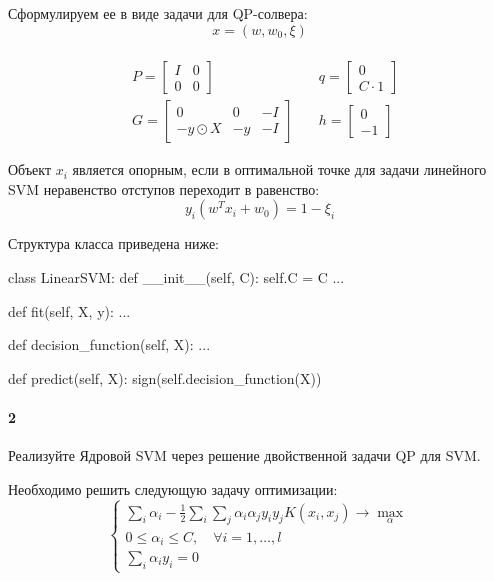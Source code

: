 \documentclass[a4paper,12pt]{article}
\begin{document}
Сформулируем ее в виде задачи для QP-солвера:
$$x = (w, w_0, \xi)$$\\
$$
\begin{aligned}
  &P = \left[ 
         \begin{array}{c|c}
           I & 0 \\
           \hline
           0 & 0
         \end{array}
       \right]
  \quad
  &q = \left[ 
         \begin{array}{c}
           0 \\
           \hline
           C \cdot 1
         \end{array}
       \right] \\
  &G = \left[
         \begin{array}{c|c|c}
           0 & 0 & -I \\
           \hline
           -y \odot X & -y & -I
         \end{array}
       \right]
  \quad 
  &h = \left[
         \begin{array}{c}
            0 \\
            \hline
            -1
         \end{array}
       \right]
\end{aligned}
$$

Объект $x_i$ является опорным, если в оптимальной точке для задачи линейного SVM неравенство отступов переходит в равенство:
$$y_i (w^T x_i + w_0) = 1 - \xi_i$$

\clearpage
Структура класса приведена ниже:
\begin{python3}
class LinearSVM:
    def __init__(self, C):
        self.C = C
        ...

    def fit(self, X, y):
        ...
        
    def decision_function(self, X):
        ...
        
    def predict(self, X):
        sign(self.decision_function(X))
\end{python3}

\paragraph{2} Реализуйте Ядровой SVM через решение двойственной задачи QP для SVM.

Необходимо решить следующую задачу оптимизации:
\begin{equation*}
  \begin{cases}

    \sum\limits_{i} \alpha_i - \frac{1}{2}\sum\limits_{i}\sum\limits_{j} \alpha_{i}\alpha_{j} y_{i}y_{j} K(x_{i}, x_{j}) \to \max\limits_{\alpha} \\
    0 \le \alpha_i \le C, \quad \forall i = 1, \dots, l \\
    \sum\limits_{i} \alpha_i y_i = 0

  \end{cases}
\end{equation*}
\end{document}
